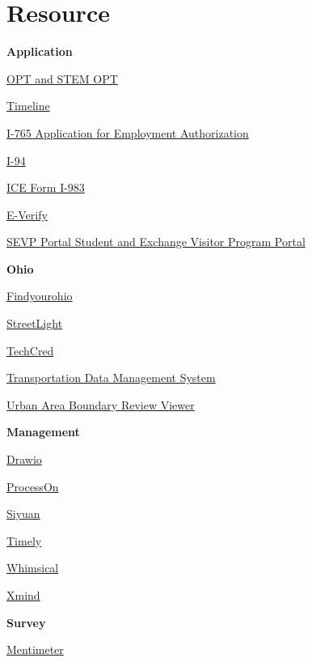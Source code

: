 \documentclass[
]{book}
\begin{document}
\hypertarget{welcome}{%
\chapter{Resource}\label{welcome}}

\textbf{Application}

\href{https://www.uscis.gov/working-in-the-united-states/students-and-exchange-visitors/optional-practical-training-opt-for-f-1-students}{OPT and STEM OPT}

\href{https://opttimeline.com/IOE?CASE_TY=EAD}{Timeline}

\href{https://www.uscis.gov/i-765}{I-765 Application for Employment Authorization}

\href{https://i94.cbp.dhs.gov/I94/\#/recent-search}{I-94}

\href{https://www.ice.gov/doclib/sevis/pdf/i983.pdf}{ICE Form I-983}

\href{https://www.e-verify.gov/about-e-verify/e-verify-data/how-to-find-participating-employers}{E-Verify}

\href{https://sevp.ice.gov/opt/\#/login}{SEVP Portal \textbar{} Student and Exchange Visitor Program Portal}

\textbf{Ohio}

\href{https://www.findyourohio.com/}{Findyourohio}

\href{https://insight.streetlightdata.com/login/?/sso_auth=skilljar?next=\%2F}{StreetLight}

\href{https://techcred.ohio.gov/}{TechCred}

\href{https://morpc.public.ms2soft.com/tcds/tsearch.asp?loc=Morpc\&mod=}{Transportation Data Management System}

\href{https://gis3.dot.state.oh.us/uab-review-readonly/}{Urban Area Boundary Review Viewer}

\textbf{Management}

\href{https://app.diagrams.net/}{Drawio}

\href{https://www.processon.io/}{ProcessOn}

\href{https://b3log.org/siyuan/en/}{Siyuan}

\href{https://timelyapp.com/}{Timely}

\href{https://whimsical.com/ai}{Whimsical}

\href{https://xmind.app/share/}{Xmind}

\textbf{Survey}

\href{https://www.mentimeter.com/app/home}{Mentimeter}
\end{document}
